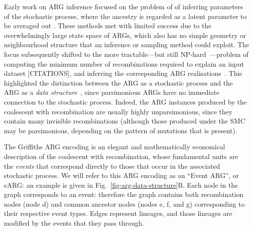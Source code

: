 \documentclass{article}
\begin{document}
Early work on ARG inference focused on the problem of
of inferring parameters of the
stochastic process, where the ancestry is regarded as a
latent parameter to be averaged out
\citep[e.g.][]{griffiths1996ancestral,kuhner2000maximum, nielsen2000estimation,
fearnhead2001estimating}.
These methods met with limited success
due to the overwhelmingly large state space of ARGs, which also has
no simple geometry or neighbourhood structure that an inference or
sampling method could exploit.
The focus subsequently shifted to the more
tractable---but still NP-hard~\citep{wang2001perfect}---problem of computing
the minimum number of recombinations required
to explain an input dataset [CITATIONS], and inferring the corresponding
ARG realisations~\citep{song2003parsimonious,song2005efficient,lyngso2005minimum}.
This highlighted the distinction between the ARG as a stochastic process
and the ARG as a \emph{data structure}~\citep{minichiello2006mapping},
since parsimonious ARGs have no immediate connection to
the stochastic process. Indeed, the ARG instances produced by
the coalescent with recombination are usually highly unparsimonious,
since they contain many invisible recombinations
(although those produced under the SMC may be parsimonious, depending
on the pattern of mutations that is present).

The Griffiths ARG encoding is an elegant and mathematically
economical description of the coalescent with recombination, whose
fundamental units are the  \emph{events} that correspond directly
to those that occur in the associated stochastic process. We will refer
to this ARG encoding as an ``Event ARG'', or eARG:
an example is given in Fig.~\ref{fig-arg-data-structure}B.
Each node in the graph corresponds to an event: therefore the graph
contains both recombination nodes (node \textsf{d}) and common ancestor
nodes (nodes \textsf{e}, \textsf{f}, and \textsf{g}) corresponding to their
respective event types. Edges represent lineages,
and those lineages are modified by the events that they pass through.
\end{document}
